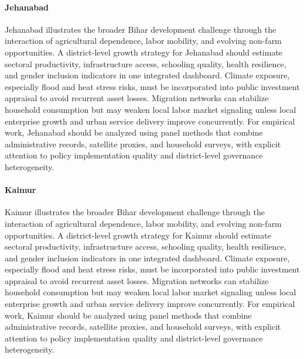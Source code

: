 \documentclass[preprint,12pt]{elsarticle}
\begin{document}
\paragraph{Jehanabad} Jehanabad illustrates the broader Bihar development challenge through the interaction of agricultural dependence, labor mobility, and evolving non-farm opportunities. A district-level growth strategy for Jehanabad should estimate sectoral productivity, infrastructure access, schooling quality, health resilience, and gender inclusion indicators in one integrated dashboard. Climate exposure, especially flood and heat stress risks, must be incorporated into public investment appraisal to avoid recurrent asset losses. Migration networks can stabilize household consumption but may weaken local labor market signaling unless local enterprise growth and urban service delivery improve concurrently. For empirical work, Jehanabad should be analyzed using panel methods that combine administrative records, satellite proxies, and household surveys, with explicit attention to policy implementation quality and district-level governance heterogeneity.

\paragraph{Kaimur} Kaimur illustrates the broader Bihar development challenge through the interaction of agricultural dependence, labor mobility, and evolving non-farm opportunities. A district-level growth strategy for Kaimur should estimate sectoral productivity, infrastructure access, schooling quality, health resilience, and gender inclusion indicators in one integrated dashboard. Climate exposure, especially flood and heat stress risks, must be incorporated into public investment appraisal to avoid recurrent asset losses. Migration networks can stabilize household consumption but may weaken local labor market signaling unless local enterprise growth and urban service delivery improve concurrently. For empirical work, Kaimur should be analyzed using panel methods that combine administrative records, satellite proxies, and household surveys, with explicit attention to policy implementation quality and district-level governance heterogeneity.
\end{document}
